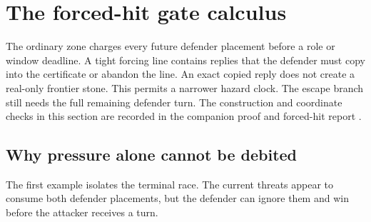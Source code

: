 \section{The forced-hit gate calculus}
\label{sec:gates}

The ordinary zone charges every future defender placement before a role or
window deadline.  A tight forcing line contains replies that the defender
must copy into the certificate or abandon the line.  An exact copied reply
does not create a real-only frontier stone.  This permits a narrower hazard
clock.  The escape branch still needs the full remaining defender turn.
The construction and coordinate checks in this section are recorded in the
companion proof and forced-hit report \cite{hexobot-companions}.

\subsection{Why pressure alone cannot be debited}

The first example isolates the terminal race.  The current threats appear to
consume both defender placements, but the defender can ignore them and win
before the attacker receives a turn.


